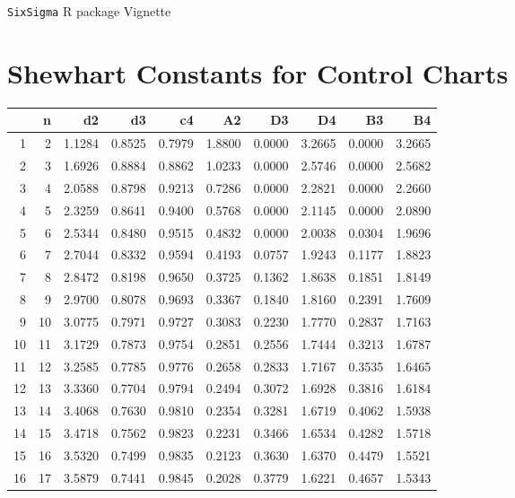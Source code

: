 \documentclass{article}
\begin{document}
\texttt{SixSigma} R package Vignette


\section*{Shewhart Constants for Control Charts}

\begin{tabular}{rrrrrrrrrr}
  \hline
 & n & d2 & d3 & c4 & A2 & D3 & D4 & B3 & B4 \\ 
  \hline
1 &     2 & 1.1284 & 0.8525 & 0.7979 & 1.8800 & 0.0000 & 3.2665 & 0.0000 & 3.2665 \\ 
  2 &     3 & 1.6926 & 0.8884 & 0.8862 & 1.0233 & 0.0000 & 2.5746 & 0.0000 & 2.5682 \\ 
  3 &     4 & 2.0588 & 0.8798 & 0.9213 & 0.7286 & 0.0000 & 2.2821 & 0.0000 & 2.2660 \\ 
  4 &     5 & 2.3259 & 0.8641 & 0.9400 & 0.5768 & 0.0000 & 2.1145 & 0.0000 & 2.0890 \\ 
  5 &     6 & 2.5344 & 0.8480 & 0.9515 & 0.4832 & 0.0000 & 2.0038 & 0.0304 & 1.9696 \\ 
  6 &     7 & 2.7044 & 0.8332 & 0.9594 & 0.4193 & 0.0757 & 1.9243 & 0.1177 & 1.8823 \\ 
  7 &     8 & 2.8472 & 0.8198 & 0.9650 & 0.3725 & 0.1362 & 1.8638 & 0.1851 & 1.8149 \\ 
  8 &     9 & 2.9700 & 0.8078 & 0.9693 & 0.3367 & 0.1840 & 1.8160 & 0.2391 & 1.7609 \\ 
  9 &    10 & 3.0775 & 0.7971 & 0.9727 & 0.3083 & 0.2230 & 1.7770 & 0.2837 & 1.7163 \\ 
  10 &    11 & 3.1729 & 0.7873 & 0.9754 & 0.2851 & 0.2556 & 1.7444 & 0.3213 & 1.6787 \\ 
  11 &    12 & 3.2585 & 0.7785 & 0.9776 & 0.2658 & 0.2833 & 1.7167 & 0.3535 & 1.6465 \\ 
  12 &    13 & 3.3360 & 0.7704 & 0.9794 & 0.2494 & 0.3072 & 1.6928 & 0.3816 & 1.6184 \\ 
  13 &    14 & 3.4068 & 0.7630 & 0.9810 & 0.2354 & 0.3281 & 1.6719 & 0.4062 & 1.5938 \\ 
  14 &    15 & 3.4718 & 0.7562 & 0.9823 & 0.2231 & 0.3466 & 1.6534 & 0.4282 & 1.5718 \\ 
  15 &    16 & 3.5320 & 0.7499 & 0.9835 & 0.2123 & 0.3630 & 1.6370 & 0.4479 & 1.5521 \\ 
  16 &    17 & 3.5879 & 0.7441 & 0.9845 & 0.2028 & 0.3779 & 1.6221 & 0.4657 & 1.5343 \\ 

\end{tabular}
\end{document}
